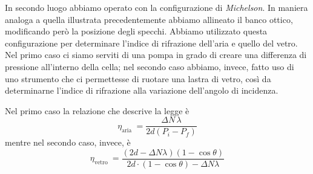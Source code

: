 In secondo luogo abbiamo operato con la configurazione di \textit{Michelson}. In maniera analoga a quella illustrata precedentemente abbiamo allineato il banco ottico, modificando però la posizione degli specchi. Abbiamo utilizzato questa configurazione per determinare l'indice di rifrazione dell'aria e quello del vetro. Nel primo caso ci siamo serviti di una pompa in grado di creare una differenza di pressione all'interno della cella; nel secondo caso abbiamo, invece, fatto uso di uno strumento che ci permettesse di ruotare una lastra di vetro, così da determinarne l'indice di rifrazione alla variazione dell'angolo di incidenza.

Nel primo caso la relazione che descrive la legge è
\begin{equation}
   \eta_{\text {aria }}=\dfrac{\Delta N\,\lambda}{2d(P_i-P_f)}
   \label{aria}
\end{equation}
mentre nel secondo caso, invece, è
\begin{equation}
\eta_{\text {vetro }}=\frac{(2 d-\Delta N \lambda)(1-\cos \theta)}{2 d \cdot(1-\cos \theta)-\Delta N \lambda}
\label{eq 3}
\end{equation}
